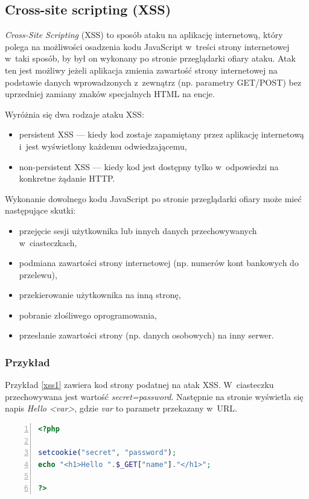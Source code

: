 \documentclass[12pt,a4paper,polish,thesis]{dcsbook}
\begin{document}
\subsection{Cross-site scripting (XSS)}
\textit{Cross-Site Scripting} (XSS) to sposób ataku na aplikację internetową, który polega na możliwości osadzenia kodu JavaScript w~treści strony internetowej w~taki sposób, by był on wykonany po stronie przeglądarki ofiary ataku. Atak ten jest możliwy jeżeli aplikacja zmienia zawartość strony internetowej na podstawie danych wprowadzonych z~zewnątrz (np. parametry GET/POST) bez uprzedniej zamiany znaków specjalnych HTML na encje. 

Wyróżnia się dwa rodzaje ataku XSS:
\begin{itemize}
\item persistent XSS --- kiedy kod zostaje zapamiętany przez aplikację internetową i~jest wyświetlony każdemu odwiedzającemu,
\item non-persistent XSS --- kiedy kod jest dostępny tylko w~odpowiedzi na konkretne żądanie HTTP.
\end{itemize}

Wykonanie dowolnego kodu JavaScript po stronie przeglądarki ofiary może mieć następujące skutki:
\begin{itemize}
\item przejęcie sesji użytkownika lub innych danych przechowywanych w~ciasteczkach,
\item podmiana zawartości strony internetowej (np. numerów kont bankowych do przelewu),
\item przekierowanie użytkownika na inną stronę,
\item pobranie złośliwego oprogramowania,
\item przesłanie zawartości strony (np. danych osobowych) na inny serwer.
\end{itemize}

\subsubsection*{Przykład}
Przykład \ref{xss1} zawiera kod strony podatnej na atak XSS. W~ciasteczku przechowywana jest wartość \textit{secret=password}. Następnie na stronie wyświetla się napis \textit{Hello <var>}, gdzie \textit{var} to parametr przekazany w~URL.

\begin{lstlisting}[language=php,frame=single,caption=przykładowy kod strony podatnej na XSS,label=xss1,numbers=left]
<?php

setcookie("secret", "password");
echo "<h1>Hello ".$_GET["name"]."</h1>";

?>
\end{lstlisting}
\end{document}
